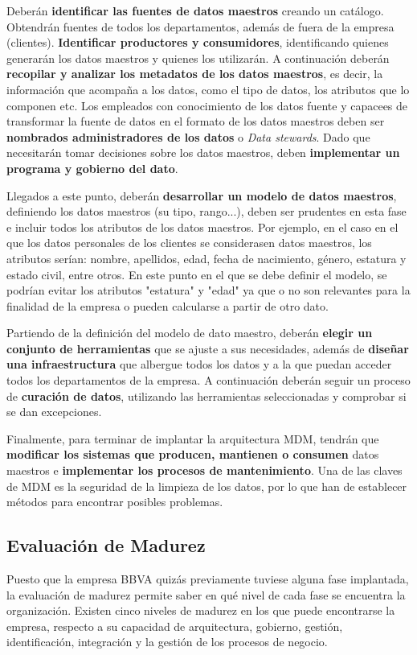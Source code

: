 \documentclass{article}
\begin{document}
Deberán \textbf{identificar las fuentes de datos maestros} creando un catálogo. Obtendrán fuentes de todos los departamentos, además de fuera de la empresa (clientes). \textbf{Identificar productores y consumidores}, identificando quienes generarán los datos maestros y quienes los utilizarán. A continuación deberán \textbf{recopilar y analizar los metadatos de los datos maestros}, es decir, la información que acompaña a los datos, como el tipo de datos, los atributos que lo componen etc. Los empleados con conocimiento de los datos fuente y capacees de transformar la fuente de datos en el formato de los datos maestros deben ser \textbf{nombrados administradores de los datos} o \textit{Data stewards}. Dado que necesitarán tomar decisiones sobre los datos maestros, deben \textbf{implementar un programa y gobierno del dato}.

Llegados a este punto, deberán \textbf{desarrollar un modelo de datos maestros}, definiendo los datos maestros (su tipo, rango...), deben ser prudentes en esta fase e incluir todos los atributos de los datos maestros. Por ejemplo, en el caso en el que los datos personales de los clientes se considerasen datos maestros, los atributos serían: nombre, apellidos, edad, fecha de nacimiento, género, estatura y estado civil, entre otros. En este punto en el que se debe definir el modelo, se podrían evitar los atributos "estatura" y "edad" ya que o no son relevantes para la finalidad de la empresa o pueden calcularse a partir de otro dato.

Partiendo de la definición del modelo de dato maestro, deberán \textbf{elegir un conjunto de herramientas} que se ajuste a sus necesidades, además de \textbf{diseñar una infraestructura} que albergue todos los datos y a la que puedan acceder todos los departamentos de la empresa. A continuación deberán seguir un proceso de \textbf{curación de datos}, utilizando las herramientas seleccionadas y comprobar si se dan excepciones. 

Finalmente, para terminar de implantar la arquitectura MDM, tendrán que \textbf{modificar los sistemas que producen, mantienen o consumen} datos maestros e \textbf{implementar los procesos de mantenimiento}. Una de las claves de MDM es la seguridad de la limpieza de los datos, por lo que han de establecer métodos para encontrar posibles problemas.

\subsection{Evaluación de Madurez}
Puesto que la empresa BBVA quizás previamente tuviese alguna fase implantada, la evaluación de madurez permite saber en qué nivel de cada fase se encuentra la organización. Existen cinco niveles de madurez en los que puede encontrarse la empresa, respecto a su capacidad de arquitectura, gobierno, gestión, identificación, integración y la gestión de los procesos de negocio.
\end{document}
